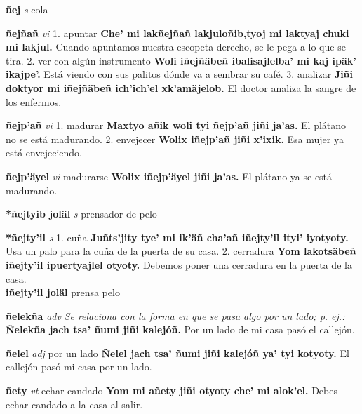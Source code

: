 \documentclass[10pt]{scrbook}
\newcommand{\entry}[1]{\textbf{#1}}
\newcommand{\onedefinition}[1]{#1.}
\newcommand{\nontranslationdef}[1]{\textit{#1}}
\newcommand{\partofspeech}[1]{\textit{#1}}
\newcommand{\spanishtranslation}[1]{#1}
\newcommand{\cholexample}[1]{\textbf{#1}}
\newcommand{\exampletranslation}[1]{#1}
\newcommand{\secondaryentry}[1]{\\\textbf{#1}}
\newcommand{\secondtranslation}[1]{#1}
\begin{document}
\begin{multicols}{2}
\entry{ñej}
\partofspeech{s}
\spanishtranslation{cola}

\entry{ñejñañ}
\partofspeech{vi}
\onedefinition{1}
\spanishtranslation{apuntar}
\cholexample{Che' mi lakñejñañ lakjuloñib,tyoj mi laktyaj chuki mi lakjul.}
\exampletranslation{Cuando apuntamos nuestra escopeta derecho, se le pega a lo que se tira.}
\onedefinition{2}
\spanishtranslation{ver con algún instrumento}
\cholexample{Woli iñejñäbeñ ibalisajlelba' mi kaj ipäk' ikajpe'.}
\exampletranslation{Está viendo con sus palitos dónde va a sembrar su café.}
\onedefinition{3}
\spanishtranslation{analizar}
\cholexample{Jiñi doktyor mi iñejñäbeñ ich'ich'el xk'amäjelob.}
\exampletranslation{El doctor analiza la sangre de los enfermos.}

\entry{ñejp'añ}
\partofspeech{vi}
\onedefinition{1}
\spanishtranslation{madurar}
\cholexample{Maxtyo añik woli tyi ñejp'añ jiñi ja'as.}
\exampletranslation{El plátano no se está madurando.}
\onedefinition{2}
\spanishtranslation{envejecer}
\cholexample{Wolix iñejp'añ jiñi x'ixik.}
\exampletranslation{Esa mujer ya está envejeciendo.}

\entry{ñejp'äyel}
\partofspeech{vi}
\spanishtranslation{madurarse}
\cholexample{Wolix iñejp'äyel jiñi ja'as.}
\exampletranslation{El plátano ya se está madurando.}

\entry{*ñejtyib joläl}
\partofspeech{s}
\spanishtranslation{prensador de pelo}

\entry{*ñejty'il}
\partofspeech{s}
\onedefinition{1}
\spanishtranslation{cuña}
\cholexample{Juñts'jity tye' mi ik'äñ cha'añ iñejty'il ityi' iyotyoty.}
\exampletranslation{Usa un palo para la cuña de la puerta de su casa.}
\onedefinition{2}
\spanishtranslation{cerradura}
\cholexample{Yom lakotsäbeñ iñejty'il ipuertyajlel otyoty.}
\exampletranslation{Debemos poner una cerradura en la puerta de la casa.}
\secondaryentry{iñejty'il joläl}
\secondtranslation{prensa pelo}

\entry{ñelekña}
\partofspeech{adv}
\nontranslationdef{Se relaciona con la forma en que se pasa algo por un lado; p. ej.:}
\cholexample{Ñelekña jach tsa' ñumi jiñi kalejóñ.}
\exampletranslation{Por un lado de mi casa pasó el callejón.}

\entry{ñelel}
\partofspeech{adj}
\spanishtranslation{por un lado}
\cholexample{Ñelel jach tsa' ñumi jiñi kalejóñ ya' tyi kotyoty.}
\exampletranslation{El callejón pasó mi casa por un lado.}

\entry{ñety}
\partofspeech{vt}
\spanishtranslation{echar candado}
\cholexample{Yom mi añety jiñi otyoty che' mi alok'el.}
\exampletranslation{Debes echar candado a la casa al salir.}


\end{multicols}
\end{document}
